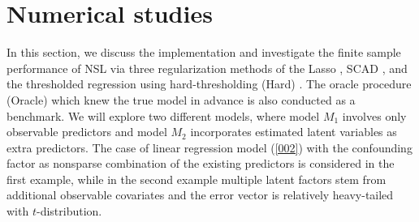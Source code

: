 \documentclass{statsoc}
\begin{document}


\section{Numerical studies} \label{Sec6}
In this section, we discuss the implementation and investigate the finite sample performance of NSL via three regularization methods of the Lasso \citep{Tibshirani1996}, SCAD \citep{Fan2001}, and the thresholded regression using hard-thresholding (Hard) \citep{Zheng2014}. The oracle procedure (Oracle) which knew the true model in advance is also conducted as a benchmark. We will explore two different models, where model $M_1$ involves only observable predictors and model $M_2$ incorporates estimated latent variables as extra predictors. The case of linear regression model (\ref{002}) with the confounding factor as nonsparse combination of the existing predictors is considered in the first example, while in the second example multiple latent factors stem from additional observable covariates and the error vector is relatively heavy-tailed with $t$-distribution.
\end{document}
